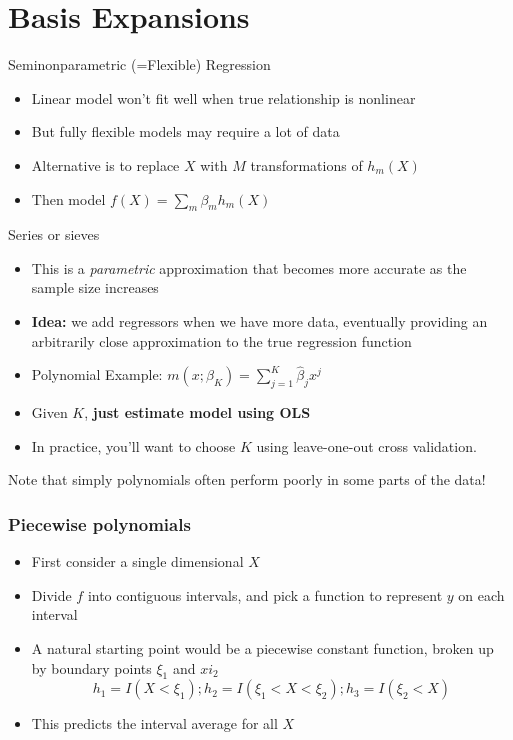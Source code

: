 \section{Basis Expansions}

\begin{frame}{Seminonparametric (=Flexible) Regression}
  \begin{itemize}
    \item Linear model won't fit well when true relationship is nonlinear
    \item But fully flexible models may require a lot of data 
    \item Alternative is to replace $X$ with $M$ transformations of $h_m(X)$
    \item Then model $f(X) = \sum_m \beta_m h_m(X)$
  \end{itemize}
\end{frame}

\begin{frame}{Series or sieves}

  \begin{itemize}
    \item This is a \textit{parametric} approximation that becomes more accurate as the sample size increases
  
    \item {\bf Idea:} we add regressors when we have more data, eventually providing an arbitrarily close approximation to the true regression function
  
    \item Polynomial Example: $ m(x;\beta_K) = \sum_{j=1}^{K} \hat \beta_j x^j$ 
    \item Given $K$, \textbf{just estimate model using OLS}
    \item In practice, you'll want to choose $K$ using leave-one-out cross validation. 
  \end{itemize}
  
  Note that simply polynomials often perform poorly in some parts of the data! 
  
\end{frame}

\begin{frame}
  \frametitle{Piecewise polynomials}
  \begin{itemize}
    \item First consider a single dimensional $X$
    \item Divide $f$ into contiguous intervals, and pick a function to represent $y$ on each interval 
    \item A natural starting point would be a piecewise constant function, broken up by boundary points $\xi_1$ and $xi_2$
    $$ h_1 = I(X < \xi_1) ; h_2 = I(\xi_1 < X < \xi_2); h_3 = I(\xi_2 < X) $$ 
    \item This predicts the interval average for all $X$

  \end{itemize}
\end{frame}    


